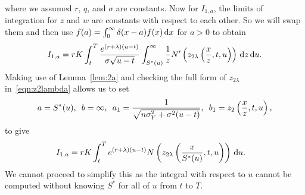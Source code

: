         		where we assumed $r$, $q$, and $\sigma$ are constants. Now for $I_{1,a}$, the limits of integration for $z$ and $w$ are constants with respect to each other. So we will swap them and then use $f(a) = \int_0^\infty \delta(x-a) f(x) \, \mathrm d x$ for $a > 0$ to obtain
        		$$
        			I_{1,a} = rK\int_t^T \frac{e^{(r+\lambda)(u-t)}}{\sigma\sqrt{u-t}}\int_{S^*(u)}^\infty \frac{1}{z} N'\left( z_{2\lambda}\left( \frac{x}{z}, t, u \right) \right) \, \mathrm d z \, \mathrm d u.
        		$$
		Making use of Lemma~\ref{lem:2a} and checking the full form of $z_{2\lambda}$ in~\eqref{eqn:z2lambda} allows us to set
			$$
				a = S^*(u), \enskip b = \infty, \enskip a_1 = \frac{1}{\sqrt{n\sigma_Y^2 + \sigma^2(u-t)}}, \enskip
			b_1 = z_2\left( \frac{x}{z}, t, u \right),
			$$
		to give
			\begin{align*}
				I_{1,a} &=  rK\int_t^T e^{(r+\lambda)(u-t)}N\left(z_{2\lambda}\left( \frac{x}{S^*(u)},t,u\right) \right) \, \mathrm d u.
			\end{align*}
		We cannot proceed to simplify this as the integral with respect to $u$ cannot be computed without knowing $S^*$ for all of $u$ from $t$ to $T$.
		
